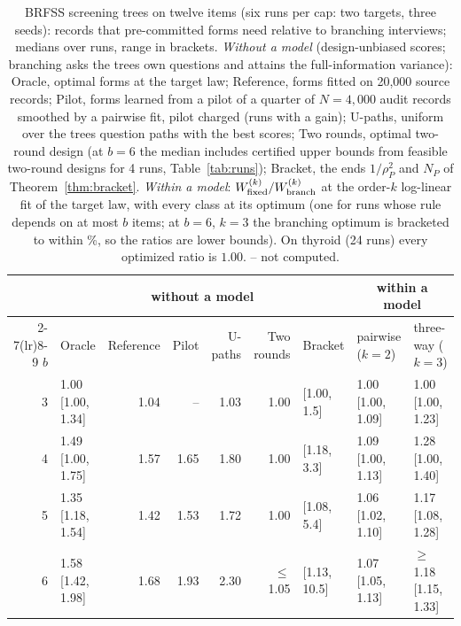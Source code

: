 \begin{table}[t]
\centering
\caption{BRFSS screening trees on twelve items (six runs per cap: two targets, three seeds): records that pre-committed forms need relative to branching interviews; medians over runs, range in brackets. \emph{Without a model} (design-unbiased scores; branching asks the tree\textquotesingle s own questions and attains the full-information variance): Oracle, optimal forms at the target law; Reference, forms fitted on 20,000 source records; Pilot, forms learned from a pilot of a quarter of $N=4{,}000$ audit records smoothed by a pairwise fit, pilot charged (runs with a gain); U-paths, uniform over the tree\textquotesingle s question paths with the best scores; Two rounds, optimal two-round design (at $b=6$ the median includes certified upper bounds from feasible two-round designs for 4 runs, Table~\ref{tab:runs}); Bracket, the ends $1/\rho_P^2$ and $N_P$ of Theorem~\ref{thm:bracket}. \emph{Within a model}: $W^{(k)}_{\rm fixed}/W^{(k)}_{\rm branch}$ at the order-$k$ log-linear fit of the target law, with every class at its optimum (one for runs whose rule depends on at most $b$ items; at $b=6$, $k=3$ the branching optimum is bracketed to within \nModelGapSix\%, so the ratios are lower bounds). On thyroid (24 runs) every optimized ratio is $1.00$. -- not computed.}
\label{tab:screening}
\footnotesize
\setlength{\tabcolsep}{5pt}
\begin{tabular}{r l r r r r l l l}
\toprule
 & \multicolumn{6}{c}{without a model} & \multicolumn{2}{c}{within a model} \\
\cmidrule(lr){2-7}\cmidrule(lr){8-9}
$b$ & Oracle & Reference & Pilot & U-paths & Two rounds & Bracket & pairwise ($k=2$) & three-way ($k=3$) \\
\midrule
3 & 1.00 [1.00, 1.34] & 1.04 & -- & 1.03 & 1.00 & [1.00, 1.5] & 1.00 [1.00, 1.09] & 1.00 [1.00, 1.23] \\
4 & 1.49 [1.00, 1.75] & 1.57 & 1.65 & 1.80 & 1.00 & [1.18, 3.3] & 1.09 [1.00, 1.13] & 1.28 [1.00, 1.40] \\
5 & 1.35 [1.18, 1.54] & 1.42 & 1.53 & 1.72 & 1.00 & [1.08, 5.4] & 1.06 [1.02, 1.10] & 1.17 [1.08, 1.28] \\
6 & 1.58 [1.42, 1.98] & 1.68 & 1.93 & 2.30 & $\le$1.05 & [1.13, 10.5] & 1.07 [1.05, 1.13] & $\ge$1.18 [1.15, 1.33] \\
\bottomrule
\end{tabular}
\end{table}
